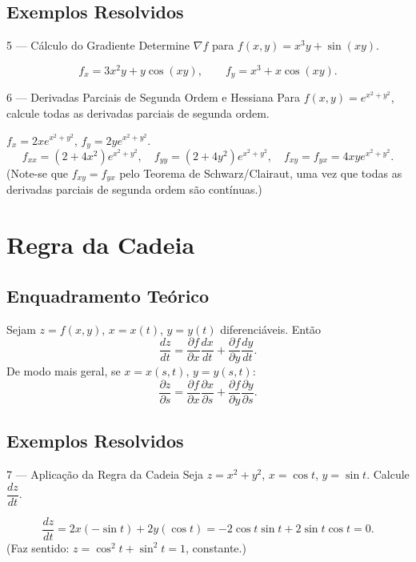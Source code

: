 \subsection{Exemplos Resolvidos}

\begin{exbox}{5 --- Cálculo do Gradiente}
  Determine $\nabla f$ para $f(x,y)=x^3 y + \sin(xy)$.
\end{exbox}
\begin{solbox}
  \[
    f_x = 3x^2 y + y\cos(xy), \qquad f_y = x^3 + x\cos(xy).
  \]
\end{solbox}

\begin{exbox}{6 --- Derivadas Parciais de Segunda Ordem e Hessiana}
  Para $f(x,y)=e^{x^2+y^2}$, calcule todas as derivadas parciais de
  segunda ordem.
\end{exbox}
\begin{solbox}
  $f_x = 2xe^{x^2+y^2}$, $f_y = 2ye^{x^2+y^2}$.
  \[
    f_{xx}=(2+4x^2)e^{x^2+y^2},\quad f_{yy}=(2+4y^2)e^{x^2+y^2},\quad
    f_{xy}=f_{yx}=4xye^{x^2+y^2}.
  \]
  (Note-se que $f_{xy}=f_{yx}$ pelo Teorema de Schwarz/Clairaut, uma vez
  que todas as derivadas parciais de segunda ordem são contínuas.)
\end{solbox}


\section{Regra da Cadeia}

\subsection{Enquadramento Teórico}

\begin{thmbox}[title={Regra da Cadeia para Funções de Várias Variáveis}]
  Sejam $z=f(x,y)$, $x=x(t)$, $y=y(t)$ diferenciáveis. Então
  \[
    \frac{dz}{dt} = \frac{\partial f}{\partial x}\frac{dx}{dt}
                  + \frac{\partial f}{\partial y}\frac{dy}{dt}.
  \]
  De modo mais geral, se $x=x(s,t)$, $y=y(s,t)$:
  \[
    \frac{\partial z}{\partial s}
      = \frac{\partial f}{\partial x}\frac{\partial x}{\partial s}
      + \frac{\partial f}{\partial y}\frac{\partial y}{\partial s}.
  \]
\end{thmbox}

\subsection{Exemplos Resolvidos}

\begin{exbox}{7 --- Aplicação da Regra da Cadeia}
  Seja $z = x^2+y^2$, $x=\cos t$, $y=\sin t$. Calcule $\dfrac{dz}{dt}$.
\end{exbox}
\begin{solbox}
  \[
    \frac{dz}{dt} = 2x(-\sin t)+2y(\cos t) = -2\cos t\sin t + 2\sin t\cos t = 0.
  \]
  (Faz sentido: $z = \cos^2 t + \sin^2 t = 1$, constante.)
\end{solbox}
